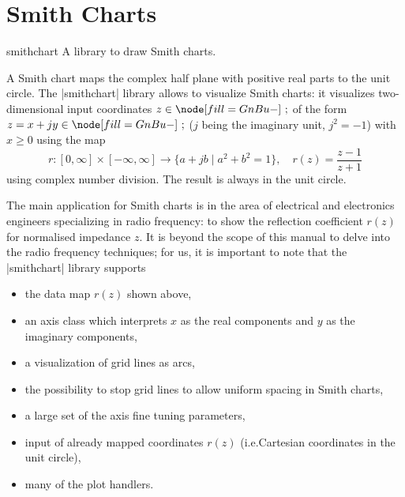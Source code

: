 
\section{Smith Charts}
\label{sec:smithcharts}

\begingroup
\def\pgfplotsmanualcurlibrary{smithchart}

\begin{pgfplotslibrary}{smithchart}
    A library to draw Smith charts.

    A Smith chart maps the complex half plane with positive real parts to the
    unit circle. The |smithchart| library allows \PGFPlots{} to visualize Smith
    charts: it visualizes two-dimensional input coordinates $z \in \C $ of the
    form $z = x+ j y \in \C$ ($j$ being the imaginary unit, $j^2=-1$) with $x
    \ge 0$ using the map
        \[
            r\colon [0,\infty] \times [-\infty,\infty] \to
                \{ a+j b \;\vert\;  a^2 + b^2 = 1 \},
                    \quad r(z) = \frac{z-1}{z+1}
        \]
    using complex number division. The result is always in the unit circle.

    The main application for Smith charts is in the area of electrical and
    electronics engineers specializing in radio frequency: to show the
    reflection coefficient $r(z)$ for normalised impedance $z$. It is beyond
    the scope of this manual to delve into the radio frequency techniques; for
    us, it is important to note that the |smithchart| library supports
    \begin{itemize}
        \item the data map $r(z)$ shown above,
        \item an axis class which interprets $x$ as the real components and
            $y$ as the imaginary components,
        \item a visualization of grid lines as arcs,
        \item the possibility to stop grid lines to allow uniform spacing in
            Smith charts,
        \item a large set of the \PGFPlots{} axis fine tuning parameters,
        \item input of already mapped coordinates $r(z)$ (i.e.\@ Cartesian
            coordinates in the unit circle),
        \item many of the \PGFPlots{} plot handlers.
    \end{itemize}
\end{pgfplotslibrary}


